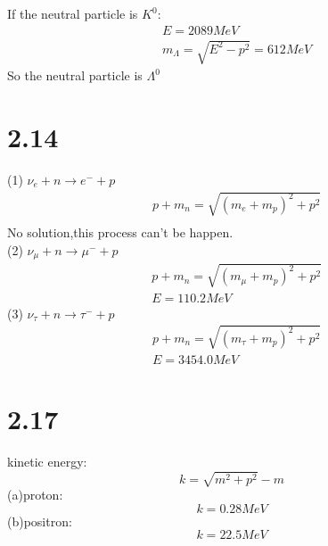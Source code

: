 \documentclass{article}
\begin{document}
\begin{CJK*}{GBK}{song}
If the neutral particle is $K^0$:
\begin{equation}
\begin{aligned}
&E=2089MeV\\
&m_{\Lambda}=\sqrt{E^2-p^2}=612MeV
\end{aligned}
\end{equation}
So the neutral particle is $\Lambda^0$















\section{2.14}
(1) $\nu_e+n\rightarrow e^-+p$\\
\begin{equation}
\begin{aligned}
&p+m_n=\sqrt{(m_e+m_p)^2+p^2}\\
\end{aligned}
\end{equation}
No solution,this process can't be happen.\\
(2)  $\nu_{\mu}+n\rightarrow\mu^-+p$
\begin{equation}
\begin{aligned}
&p+m_n=\sqrt{(m_{\mu}+m_p)^2+p^2}\\
&E=110.2MeV
\end{aligned}
\end{equation}
(3) $\nu_{\tau}+n\rightarrow\tau^-+p$
\begin{equation}
\begin{aligned}
&p+m_n=\sqrt{(m_{\tau}+m_p)^2+p^2}\\
&E=3454.0MeV
\end{aligned}
\end{equation}






\section{2.17}
kinetic energy:
\begin{equation}
k=\sqrt{m^2+p^2}-m
\end{equation}
(a)proton:
\begin{equation}
k=0.28MeV
\end{equation}
(b)positron:
\begin{equation}
k=22.5MeV
\end{equation}














\end{CJK*}
\end{document}
